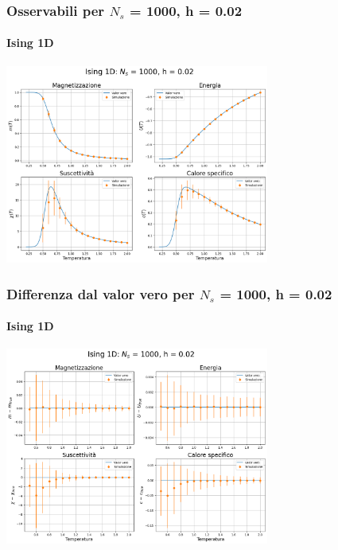 \begin{frame}
    \frametitle{Osservabili per $N_s$ = 1000, h = 0.02}
    \framesubtitle{Ising 1D}

    \centering
    \includegraphics[width=0.65\textwidth]{Immagini/backupIsing1D/obs_1000_0.02.png}

\end{frame}



\begin{frame}
    \frametitle{Differenza dal valor vero per $N_s$ = 1000, h = 0.02}
    \framesubtitle{Ising 1D}

    \centering
    \includegraphics[width=0.65\textwidth]{Immagini/backupIsing1D/obs_1000_0.02_diff.png}

\end{frame}



